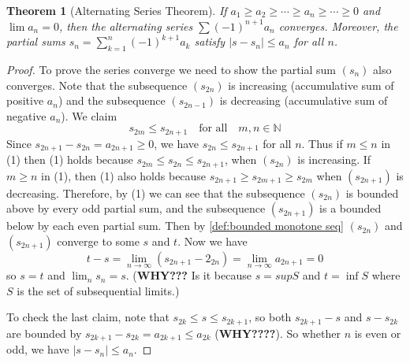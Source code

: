 \documentclass[12pt, lettersize]{book}
\theoremstyle{plain}
\newtheorem{thm}{Theorem}[section]
\theoremstyle{definition}
\theoremstyle{remark}
\begin{document}
	\begin{thm}[Alternating Series Theorem]\label{def:alternating series}
		If $a_1\geq a_2\geq\cdots\geq a_n\geq\cdots\geq0$ and $\lim a_n=0$, then the alternating series $\sum(-1)^{n+1}a_n$
		converges. Moreover, the partial sums $s_n=\sum_{k=1}^{n}(-1)^{k+1}a_k$ satisfy $|s-s_n|\leq a_n$ for all $n$.
	\end{thm}
	\begin{proof}
		To prove the series converge we need to show the partial sum $(s_n)$ also converges. Note that the subsequence
		$(s_{2n})$ is increasing (accumulative sum of positive $a_n$) and the subsequence $(s_{2n-1})$ is decreasing (accumulative sum of negative $a_n$). We claim
		\begin{equation}
			s_{2m}\leq s_{2n+1}\quad\text{for all}\quad m,n\in\mathbb{N}
		\end{equation}		
		Since $s_{2n+1}-s_{2n}=a_{2n+1}\geq0$, we have $s_{2n}\leq s_{2n+1}$ for all $n$. Thus if $m\leq n$ in (1) then (1)
		holds because $s_{2m}\leq s_{2n}\leq s_{2n+1}$, when $(s_{2n})$ is increasing. If $m\geq n$ in (1), then (1) also
		holds because $s_{2n+1}\geq s_{2m+1}\geq s_{2m}$ when $(s_{2n+1})$ is decreasing. Therefore, by (1) we can see that
		the subsequence $(s_{2n})$ is bounded above by every odd partial sum, and the subsequence $(s_{2n+1})$ is a 
		bounded below by each even partial sum. Then by \ref{def:bounded monotone seq} $(s_{2n})$ and $(s_{2n+1})$ converge
		to some $s$ and $t$. Now we have
		\begin{displaymath}
			t-s=\lim\limits_{n\rightarrow\infty}(s_{2n+1}-2_{2n})=\lim\limits_{n\rightarrow\infty}a_{2n+1}=0
		\end{displaymath}
		so $s=t$ and $\lim_ns_n=s$. (\textbf{WHY???} Is it because $s=sup S$ and $t=\inf S$ where $S$ is the set of subsequential limits.)
		
		To check the last claim, note that $s_{2k}\leq s\leq s_{2k+1}$, so both $s_{2k+1}-s$ and $s-s_{2k}$ are bounded by
		$s_{2k+1}-s_{2k}=a_{2k+1}\leq a_{2k}$ (\textbf{WHY????}). So whether $n$ is even or odd, we have $|s-s_n|\leq a_n$. 
	\end{proof}
\end{document}
